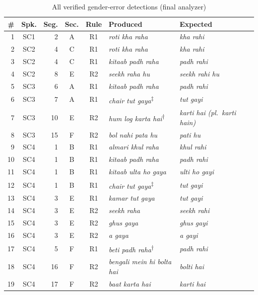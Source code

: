 \documentclass[11pt,a4paper]{report}
\begin{document}
\begin{table}[H]
\centering
\caption{All verified gender-error detections (final analyzer)}
\label{tab:alldet}
\small
\begin{tabular}{rcrcclll}
\toprule
\textbf{\#} & \textbf{Spk.} & \textbf{Seg.} & \textbf{Sec.} & \textbf{Rule} & \textbf{Produced} & \textbf{Expected} \\
\midrule
 1 & SC1 &  2 & A & R1 & \textit{roti kha raha} & \textit{kha rahi} \\
 2 & SC2 &  4 & C & R1 & \textit{roti kha raha} & \textit{kha rahi} \\
 3 & SC2 &  4 & C & R1 & \textit{kitaab padh raha} & \textit{padh rahi} \\
 4 & SC2 &  8 & E & R2 & \textit{seekh raha hu} & \textit{seekh rahi hu} \\
 5 & SC3 &  6 & A & R1 & \textit{kitaab padh raha} & \textit{padh rahi} \\
 6 & SC3 &  7 & A & R1 & \textit{chair tut gaya}\textsuperscript{$\ddagger$} & \textit{tut gayi} \\
 7 & SC3 & 10 & E & R2 & \textit{hum log karta hai}\textsuperscript{$\dagger$} & \textit{karti hai (pl.\ \textit{karti hain})} \\
 8 & SC3 & 15 & F & R2 & \textit{bol nahi pata hu} & \textit{pati hu} \\
 9 & SC4 &  1 & B & R1 & \textit{almari khul raha} & \textit{khul rahi} \\
10 & SC4 &  1 & B & R1 & \textit{kitaab padh raha} & \textit{padh rahi} \\
11 & SC4 &  1 & B & R1 & \textit{kitaab ulta ho gaya} & \textit{ulti ho gayi} \\
12 & SC4 &  1 & B & R1 & \textit{chair tut gaya}\textsuperscript{$\ddagger$} & \textit{tut gayi} \\
13 & SC4 &  3 & E & R1 & \textit{kamar tut gaya} & \textit{tut gayi} \\
14 & SC4 &  3 & E & R2 & \textit{seekh raha} & \textit{seekh rahi} \\
15 & SC4 &  3 & E & R2 & \textit{ghus gaya} & \textit{ghus gayi} \\
16 & SC4 &  3 & E & R2 & \textit{a gaya} & \textit{a gayi} \\
17 & SC4 &  5 & F & R1 & \textit{beti padh raha}\textsuperscript{$\dagger$} & \textit{padh rahi} \\
18 & SC4 & 16 & F & R2 & \textit{bengali mein hi bolta hai} & \textit{bolti hai} \\
19 & SC4 & 17 & F & R2 & \textit{baat karta hai} & \textit{karti hai} \\

\end{tabular}
\end{table}
\end{document}
